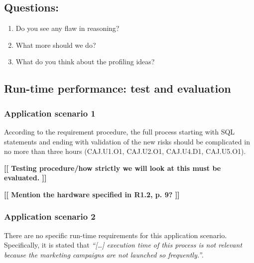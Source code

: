 \documentclass{article}
\theoremstyle{theorem}
\theoremstyle{definition}
\newcommand{\comment}[1]{ \begin{center}{\bf [[ #1 ]]}\end{center}}
\begin{document}
\subsection*{Questions: }
\begin{enumerate}
\item Do you see any flaw in reasoning?
\item What more should we do?
\item What do you think about the profiling ideas?
\end{enumerate}




\subsection{Run-time performance: test and evaluation}
\subsubsection{Application scenario 1}

According to the requirement procedure, the full process starting with SQL statements and ending with validation of the new risks should be complicated in no more than three hours (CAJ.U1.O1, CAJ.U2.O1, CAJ.U4.D1, CAJ.U5.O1).


\comment{Testing procedure/how strictly we will look at this must be evaluated.}

\comment{Mention the hardware specified in R1.2, p. 9?}


\subsubsection{Application scenario 2}

There are no specific run-time requirements for this application scenario. Specifically, it is stated that \textit{``[\ldots] execution time of this process is not relevant because the marketing campaigns are not launched so frequently.''}.
\end{document}
